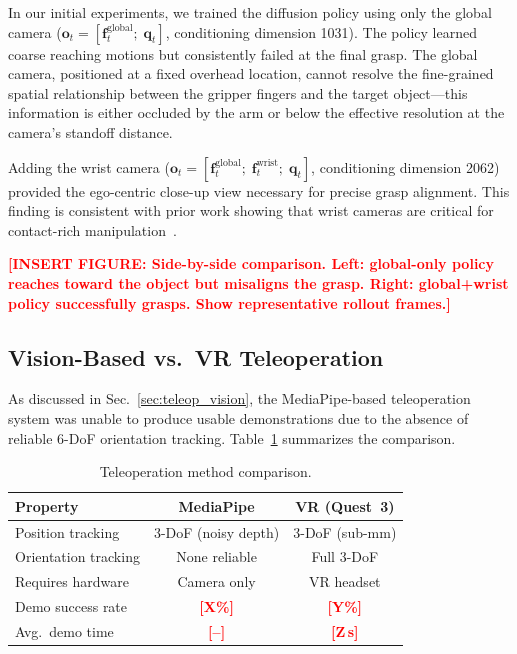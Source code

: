 \documentclass[conference]{IEEEtran}
\newcommand{\placeholder}[1]{\textcolor{red}{\textbf{[#1]}}}
\begin{document}
In our initial experiments, we trained the diffusion policy using only the global camera ($\mathbf{o}_t = [\mathbf{f}_t^\mathrm{global};\;\mathbf{q}_t]$, conditioning dimension 1031). The policy learned coarse reaching motions but consistently failed at the final grasp. The global camera, positioned at a fixed overhead location, cannot resolve the fine-grained spatial relationship between the gripper fingers and the target object---this information is either occluded by the arm or below the effective resolution at the camera's standoff distance.

Adding the wrist camera ($\mathbf{o}_t = [\mathbf{f}_t^\mathrm{global};\;\mathbf{f}_t^\mathrm{wrist};\;\mathbf{q}_t]$, conditioning dimension 2062) provided the ego-centric close-up view necessary for precise grasp alignment. This finding is consistent with prior work showing that wrist cameras are critical for contact-rich manipulation~\cite{chi2023diffusion, zhao2023act}.

\placeholder{INSERT FIGURE: Side-by-side comparison. Left: global-only policy reaches toward the object but misaligns the grasp. Right: global+wrist policy successfully grasps. Show representative rollout frames.}

\subsection{Vision-Based vs.\ VR Teleoperation}
As discussed in Sec.~\ref{sec:teleop_vision}, the MediaPipe-based teleoperation system was unable to produce usable demonstrations due to the absence of reliable 6-DoF orientation tracking. Table~\ref{tab:teleop_comparison} summarizes the comparison.

\begin{table}[t]
\centering
\caption{Teleoperation method comparison.}
\label{tab:teleop_comparison}
\begin{tabular}{@{}lcc@{}}
\toprule
\textbf{Property} & \textbf{MediaPipe} & \textbf{VR (Quest~3)} \\
\midrule
Position tracking  & 3-DoF (noisy depth) & 3-DoF (sub-mm) \\
Orientation tracking & None reliable & Full 3-DoF \\
Requires hardware & Camera only & VR headset \\
Demo success rate  & \placeholder{X\%} & \placeholder{Y\%} \\
Avg.\ demo time   & \placeholder{--} & \placeholder{Z\,s} \\
\bottomrule
\end{tabular}
\end{table}
\end{document}
